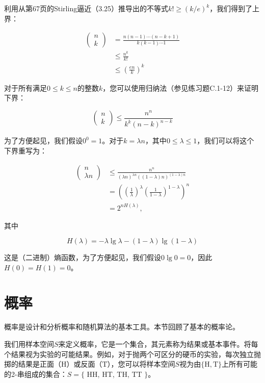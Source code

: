 \documentclass[lang=cn,newtx,10pt,scheme=chinese]{elegantbook}
\begin{document}
利用从第67页的Stirling逼近（3.25）推导出的不等式$k ! \geq(k / e)^k$，我们得到了上界：

$$
\begin{aligned}
\left(\begin{array}{l}
n \\
k
\end{array}\right) & =\frac{n(n-1) \cdots(n-k+1)}{k(k-1) \cdots 1} \\
& \leq \frac{n^k}{k !} \\
& \leq\left(\frac{e n}{k}\right)^k
\end{aligned}
$$

对于所有满足$0 \leq k \leq n$的整数$k$，您可以使用归纳法（参见练习题C.1-12）来证明下界：

$$
\left(\begin{array}{l}
n \\
k
\end{array}\right) \leq \frac{n^n}{k^k(n-k)^{n-k}}
$$

为了方便起见，我们假设$0^0=1$。对于$k=\lambda n$，其中$0 \leq \lambda \leq 1$，我们可以将这个下界重写为：

$$
\begin{aligned}
\left(\begin{array}{c}
n \\
\lambda n
\end{array}\right) & \leq \frac{n^n}{(\lambda n)^{\lambda n}((1-\lambda) n)^{(1-\lambda) n}} \\
& =\left(\left(\frac{1}{\lambda}\right)^\lambda\left(\frac{1}{1-\lambda}\right)^{1-\lambda}\right)^n \\
& =2^{n H(\lambda)},
\end{aligned}
$$

其中

$$
H(\lambda)=-\lambda \lg \lambda-(1-\lambda) \lg (1-\lambda)
$$

这是（二进制）熵函数，为了方便起见，我们假设$0 \lg 0=0$，因此$H(0)=H(1)=0$。

\section{概率}

概率是设计和分析概率和随机算法的基本工具。本节回顾了基本的概率论。

我们用样本空间$S$来定义概率，它是一个集合，其元素称为结果或基本事件。将每个结果视为实验的可能结果。例如，对于抛两个可区分的硬币的实验，每次独立抛掷的结果是正面（$\mathrm{H}$）或反面（$\mathrm{T}$），您可以将样本空间$S$视为由$\{\mathrm{H}, \mathrm{T}\}$上所有可能的2-串组成的集合：$S=\{$ HH, HT, TH, TT $\}$。
\end{document}
